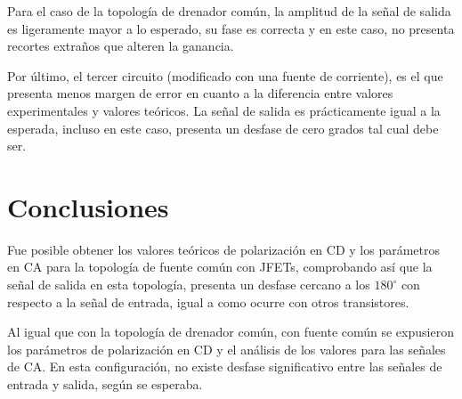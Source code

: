 \documentclass[journal]{IEEEtran}
\begin{document}
Para el caso de la topología de drenador común, la amplitud de la señal de salida es ligeramente mayor a lo esperado, 
su fase es correcta y en este caso, no presenta recortes extraños que alteren la ganancia. 

Por último, el tercer circuito (modificado con una fuente de corriente), es el que presenta menos margen de error
en cuanto a la diferencia entre valores experimentales y valores teóricos. La señal de salida es prácticamente
igual a la esperada, incluso en este caso, presenta un desfase de cero grados tal cual debe ser. 

\section{Conclusiones}
Fue posible obtener los valores teóricos de polarización en CD y los parámetros en CA para la topología de fuente
común con JFETs, comprobando así que la señal de salida en esta topología, presenta un desfase cercano a los $180^\circ$
con respecto a la señal de entrada, igual a como ocurre con otros transistores.

Al igual que con la topología de drenador común, con fuente común se expusieron los parámetros de polarización en CD
y el análisis de los valores para las señales de CA. En esta configuración, no existe desfase significativo entre las 
señales de entrada y salida, según se esperaba. 

\appendices
\end{document}
